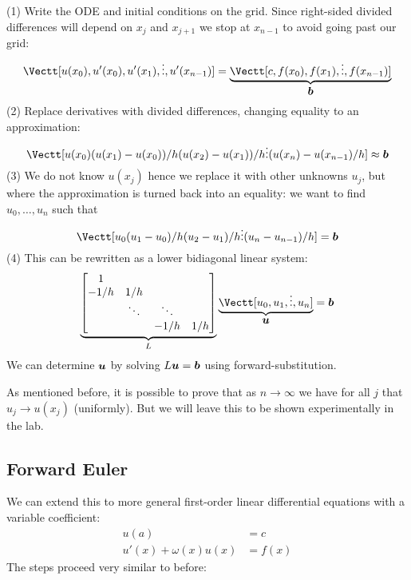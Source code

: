 (1) Write the ODE and initial conditions on the grid. Since right-sided divided differences will depend on $x_j$ and $x_{j+1}$ we stop at $x_{n-1}$ to avoid going past our grid: 
\[
\Vectt[u(x_0) , 
     u'(x_0) ,
u'(x_1) ,
\ensuremath{\vdots} ,
u'(x_{n-1})] = \underbrace{\Vectt[c, f(x_0), f(x_1), \ensuremath{\vdots} , f(x_{n-1})]}_{\ensuremath{\bm{\b}}}
\]
(2) Replace derivatives with divided differences, changing equality to an approximation:
\[
\Vectt[u(x_0) \\ 
(u(x_1) - u(x_0))/h \\
(u(x_2) - u(x_1))/h \\
\ensuremath{\vdots} \\
(u(x_n) - u(x_{n-1})/h] \ensuremath{\approx} \ensuremath{\bm{\b}}
\]
(3) We do not know $u(x_j)$ hence we replace it with other unknowns $u_j$, but where the approximation is turned back into an equality: we want to find $u_0,\ensuremath{\ldots},u_n$ such that
\[
\Vectt[u_0 \\ 
(u_1 - u_0)/h \\
(u_2 - u_1)/h \\
\ensuremath{\vdots} \\
(u_n - u_{n-1})/h] = \ensuremath{\bm{\b}}
\]
(4) This can be rewritten as a lower bidiagonal linear system:
\[
\underbrace{\begin{bmatrix}
    1 \\ 
    -1/h & 1/h \\
    & \ensuremath{\ddots} & \ensuremath{\ddots} \\
    && -1/h & 1/h \end{bmatrix}}_L \underbrace{\Vectt[u_0,u_1,\ensuremath{\vdots},u_n]}_{\ensuremath{\bm{\u}}} = \ensuremath{\bm{\b}}
\]
We can determine $\bm{{\mbox{\boldmath$u$\unboldmath}}}$ by solving $L \bm{{\mbox{\boldmath$u$\unboldmath}}} = \bm{{\mbox{\boldmath$b$\unboldmath}}}$ using forward-substitution.

As mentioned before, it is possible to prove that as $n \ensuremath{\rightarrow} \ensuremath{\infty}$ we have for all $j$ that $u_j \ensuremath{\rightarrow} u(x_j)$ (uniformly). But we will leave this to be shown experimentally in the lab.

\subsection{Forward Euler}
We can extend this to more general first-order linear differential equations with a variable coefficient:
\begin{align*}
u(a) &= c \\
u'(x) + \ensuremath{\omega}(x) u(x) &= f(x)
\end{align*}
The steps proceed very similar to before:

